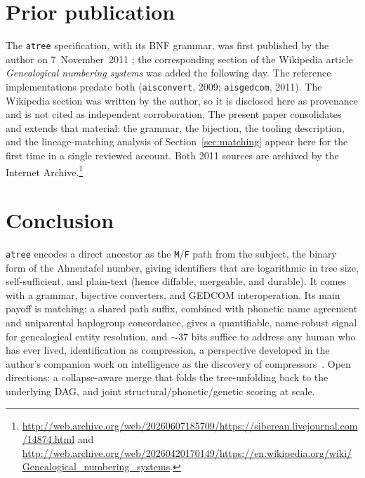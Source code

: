 \documentclass[11pt]{article}
\newcommand{\atree}{\texttt{atree}}
\begin{document}
\section{Prior publication}
\label{sec:provenance}
The \atree{} specification, with its BNF grammar, was first published by the author on
7~November~2011 \cite{lj_atree}; the corresponding section of the Wikipedia article
\emph{Genealogical numbering systems} \cite{wiki_gns} was added the following day. The reference
implementations predate both (\texttt{aisconvert}, 2009; \texttt{aisgedcom}, 2011). The Wikipedia
section was written by the author, so it is disclosed here as provenance and is not cited as
independent corroboration. The present paper consolidates and extends that material: the grammar, the
bijection, the tooling description, and the lineage-matching analysis of
Section~\ref{sec:matching} appear here for the first time in a single reviewed account. Both 2011
sources are archived by the Internet Archive.\footnote{%
\url{http://web.archive.org/web/20260607185709/https://siberean.livejournal.com/14874.html} and
\url{http://web.archive.org/web/20260420170149/https://en.wikipedia.org/wiki/Genealogical_numbering_systems}.}

\section{Conclusion}
\label{sec:conclusion}
\atree{} encodes a direct ancestor as the \texttt{M}/\texttt{F} path from the subject, the binary
form of the Ahnentafel number, giving identifiers that are logarithmic in tree size,
self-sufficient, and plain-text (hence diffable, mergeable, and durable). It comes with a grammar,
bijective converters, and GEDCOM interoperation. Its main payoff is matching: a shared path suffix,
combined with phonetic name agreement and uniparental haplogroup concordance, gives a quantifiable,
name-robust signal for genealogical entity resolution, and $\sim\!37$ bits suffice to address any
human who has ever lived, identification as compression, a perspective developed in the author's
companion work on intelligence as the discovery of compressors~\cite{gavrilov_compressors}. Open
directions: a collapse-aware merge
that folds the tree-unfolding back to the underlying DAG, and joint structural/phonetic/genetic
scoring at scale.
\end{document}
